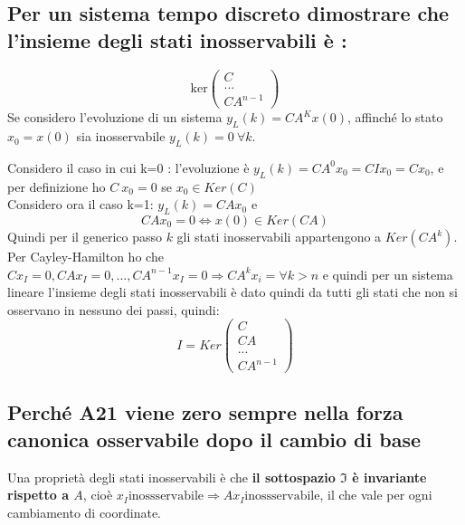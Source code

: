 \documentclass{article}
\begin{document}
\subsection{Per un sistema tempo discreto dimostrare che l'insieme degli stati inosservabili è :}
\[ \text{ker}\begin{pmatrix}C\\...\\CA^{n-1}\end{pmatrix}\]
Se considero l'evoluzione di un sistema $y_L(k)=CA^Kx(0)$, affinché lo stato $x_0 = x(0)$
sia inosservabile $y_L(k)=0\ \forall k$.

Considero il caso in cui k=0 :
l'evoluzione è  $y_L(k)=CA^0x_0=CIx_0=Cx_0$, e per definizione ho $C\ x_0=0$ se $x_0 \in Ker(C)$\\
Considero ora il caso k=1: $y_L(k)=CAx_0$ e 
\[
     CAx_0=0 \Longleftrightarrow x(0) \in Ker(CA)
\]
Quindi per il generico passo $k$ gli stati inosservabili appartengono a $Ker(CA^{k})$.
Per Cayley-Hamilton ho che $Cx_I=0,CAx_I=0,...,CA^{n-1}x_I=0 \Longrightarrow CA^kx_i = \forall k>n$ e quindi 
per un sistema lineare l'insieme degli stati inosservabili è dato quindi da tutti gli stati
che non si osservano in nessuno dei passi, quindi: 
\[
    I=Ker \begin{pmatrix}C\\CA\\...\\CA^{n-1}\end{pmatrix}
\]







\subsection{Perché A21 viene zero sempre nella forza canonica osservabile dopo il cambio di base }

Una proprietà degli stati inosservabili è che
\textbf{ il sottospazio $\mathfrak{I}$ è invariante rispetto a $A$},
cioè $x_I \text{inossservabile} \Longrightarrow Ax_I \text{inossservabile}$, il che vale 
per ogni cambiamento di coordinate.
\end{document}
